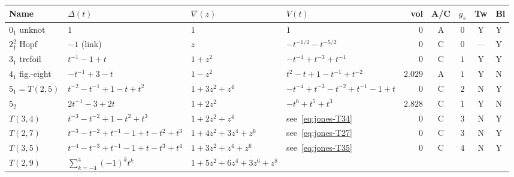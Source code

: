 \documentclass[12pt,a4paper]{report}
\providecommand{\DIFaddtex}[1]{{\protect\color{DIFgreen} \sf #1}} %
\providecommand{\DIFadd}[1]{\texorpdfstring{\DIFaddtex{#1}}{#1}} %
\begin{document}
\bigskip
{\renewcommand{\arraystretch}{1.4}
\noindent
\begin{tabular}{llllrcccl}
\hline
\DIFadd{\textbf{Name} }& \DIFadd{\textbf{$\Delta(t)$} }& \DIFadd{\textbf{$\nabla(z)$} }& \DIFadd{\textbf{$V(t)$}
  }& \DIFadd{\textbf{vol} }& \DIFadd{\textbf{A/C} }& \DIFadd{\textbf{$g_s$} }& \DIFadd{\textbf{Tw} }& \DIFadd{\textbf{Bl} }\\
\hline
\DIFadd{$0_1$ unknot
  }& \DIFadd{$1$
  }& \DIFadd{$1$
  }& \DIFadd{$1$
  }& \DIFadd{$0$
  }& \DIFadd{A }& \DIFadd{$0$ }& \DIFadd{Y }& \DIFadd{Y }\\[2pt]
\DIFadd{$2^2_1$ Hopf
  }& \DIFadd{$-1$ (link)
  }& \DIFadd{$z$
  }& \DIFadd{$-t^{-1/2}-t^{-5/2}$
  }& \DIFadd{$0$
  }& \DIFadd{C }& \DIFadd{$0$ }& \DIFadd{--- }& \DIFadd{Y }\\[2pt]
\DIFadd{$3_1$ trefoil
  }& \DIFadd{$t^{-1}-1+t$
  }& \DIFadd{$1+z^2$
  }& \DIFadd{$-t^{-4}+t^{-3}+t^{-1}$
  }& \DIFadd{$0$
  }& \DIFadd{C }& \DIFadd{$1$ }& \DIFadd{Y }& \DIFadd{Y }\\[2pt]
\DIFadd{$4_1$ fig.-eight
  }& \DIFadd{$-t^{-1}+3-t$
  }& \DIFadd{$1-z^2$
  }& \DIFadd{$t^2-t+1-t^{-1}+t^{-2}$
  }& \DIFadd{$2.029$
  }& \DIFadd{A }& \DIFadd{$1$ }& \DIFadd{Y }& \DIFadd{N }\\[2pt]
\DIFadd{$5_1 = T(2,5)$
  }& \DIFadd{$t^{-2}-t^{-1}+1-t+t^2$
  }& \DIFadd{$1+3z^2+z^4$
  }& \DIFadd{$-t^{-4}+t^{-3}-t^{-2}+t^{-1}-1+t$
  }& \DIFadd{$0$
  }& \DIFadd{C }& \DIFadd{$2$ }& \DIFadd{N }& \DIFadd{Y }\\[2pt]
\DIFadd{$5_2$
  }& \DIFadd{$2t^{-1}-3+2t$
  }& \DIFadd{$1+2z^2$
  }& \DIFadd{$-t^6+t^5+t^3$
  }& \DIFadd{$2.828$
  }& \DIFadd{C }& \DIFadd{$1$ }& \DIFadd{Y }& \DIFadd{N }\\[2pt]
\DIFadd{$T(3,4)$
  }& \DIFadd{$t^{-3}-t^{-2}+1-t^2+t^3$
  }& \DIFadd{$1+2z^2+z^4$
  }& \DIFadd{see~\eqref{eq:jones-T34}
  }& \DIFadd{$0$
  }& \DIFadd{C }& \DIFadd{$3$ }& \DIFadd{N }& \DIFadd{Y }\\[2pt]
\DIFadd{$T(2,7)$
  }& \DIFadd{$t^{-3}-t^{-2}+t^{-1}-1+t-t^2+t^3$
  }& \DIFadd{$1+4z^2+3z^4+z^6$
  }& \DIFadd{see~\eqref{eq:jones-T27}
  }& \DIFadd{$0$
  }& \DIFadd{C }& \DIFadd{$3$ }& \DIFadd{N }& \DIFadd{Y }\\[2pt]
\DIFadd{$T(3,5)$
  }& \DIFadd{$t^{-4}-t^{-3}+t^{-1}-1+t-t^3+t^4$
  }& \DIFadd{$1+3z^2+z^4+z^6$
  }& \DIFadd{see~\eqref{eq:jones-T35}
  }& \DIFadd{$0$
  }& \DIFadd{C }& \DIFadd{$4$ }& \DIFadd{N }& \DIFadd{Y }\\[2pt]
\DIFadd{$T(2,9)$
  }& \DIFadd{$\sum_{k=-4}^{4}(-1)^k t^k$
  }& \DIFadd{$1+5z^2+6z^4+3z^6+z^8$
}
\end{tabular}}
\end{document}

